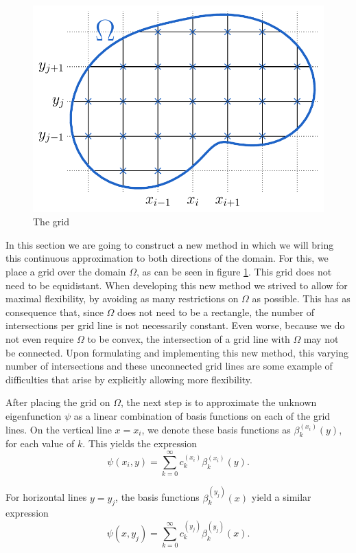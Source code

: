 \begin{figure}
    \begin{center}
        \includegraphics[width=.66\linewidth]{img/chapter4/the_method_grid.pdf}
        \caption{\label{fig:woven_method_grid} The grid}
    \end{center}
\end{figure}

In this section we are going to construct a new method in which we will bring this continuous approximation to both directions of the domain. For this, we place a grid over the domain $\Omega$, as can be seen in figure \ref{fig:woven_method_grid}. This grid does not need to be equidistant. When developing this new method we strived to allow for maximal flexibility, by avoiding as many restrictions on $\Omega$ as possible. This has as consequence that, since $\Omega$ does not need to be a rectangle, the number of intersections per grid line is not necessarily constant. Even worse, because we do not even require $\Omega$ to be convex, the intersection of a grid line with $\Omega$ may not be connected. Upon formulating and implementing this new method, this varying number of intersections and these unconnected grid lines are some example of difficulties that arise by explicitly allowing more flexibility.

After placing the grid on $\Omega$, the next step is to approximate the unknown eigenfunction $\psi$ as a linear combination of basis functions on each of the grid lines. On the vertical line $x = x_i$, we denote these basis functions as $\beta_k^{(x_i)}(y)$, for each value of $k$. This yields the expression
\begin{equation}\label{equ:c4_expression_on_lines_x}
    \psi(x_i, y) = \sum_{k=0}^\infty c_k^{(x_i)} \beta_k^{(x_i)}(y) \text{.}
\end{equation}

For horizontal lines $y = y_j$, the basis functions $\beta_k^{(y_j)}(x)$ yield a similar expression
\begin{equation}\label{equ:c4_expression_on_lines_y}
    \psi(x, y_j) = \sum_{k=0}^\infty c_k^{(y_j)} \beta_k^{(y_j)}(x) \text{.}
\end{equation}

